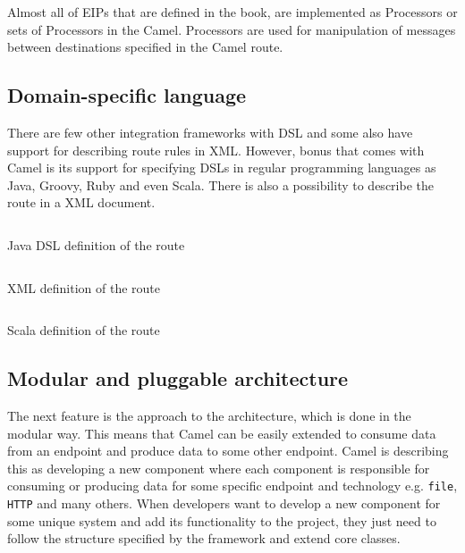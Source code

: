 \documentclass[12pt,final,oneside]{fithesis2}
\begin{document}
Almost all of EIPs that are defined in the book, are implemented as Processors or sets of Processors in the Camel. Processors are used for manipulation of messages between destinations specified in the Camel route.\cite{camel-dzone}



\subsection*{Domain-specific language}
There are few other integration frameworks with DSL and some also have support for describing route rules in XML. However, bonus that comes with Camel is its support for specifying DSLs in regular programming languages as Java, Groovy, Ruby and even Scala. There is also a possibility to describe the route in a XML document. 

\begin{listing}[ht]
	\inputminted[]{java}{sources/java_dsl_example.java}
	\caption{Java DSL definition of the route}

\end{listing}

\begin{listing}[ht]
	\inputminted[]{xml}{sources/xml_example.xml}
	\caption{XML definition of the route }

\end{listing}

\begin{listing}[ht, p!]
	\inputminted[]{java}{sources/scala_example.java}
	\caption{Scala definition of the route }

\end{listing}


\subsection*{Modular and pluggable architecture}
The next feature is the approach to the architecture, which is done in the modular way. This means that Camel can be easily extended to consume data from an endpoint and produce data to some other endpoint. Camel is describing this as developing a new component where each component is responsible for consuming or producing data for some specific endpoint and technology e.g. \texttt{file}, \texttt{HTTP} and many others. When developers want to develop a new component for some unique system and add its functionality to the project, they just need to follow the structure specified by the framework and extend core classes. 
\end{document}
